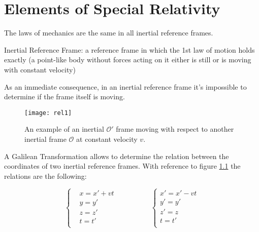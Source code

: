 %
%
%
\chapter{Elements of Special Relativity}
\label{Relativity} %
\begin{postulate}
\label{postulate:galileian-relativity}
The laws of mechanics are the same in all inertial reference frames.\\
\end{postulate}
Inertial Reference Frame: a reference frame in which the 1st law of motion holds exactly (a point-like body without forces acting on it either is still or is moving with constant velocity)

As an immediate consequence, in an inertial reference frame it's impossible to determine if the frame itself is moving. 
\begin{figure}
    \centering
    \texttt{[image: rel1]}
    \caption{An example of an inertial $\mathcal{O}'$ frame moving with respect to another inertial frame $\mathcal{O}$ at constant velocity $v$.}
    \label{fig:rel1}
\end{figure}
A Galilean Transformation allows to determine the relation between the coordinates of two inertial reference frames. With reference to figure \ref{fig:rel1} the relations are the following:

\begin{equation}
\begin{cases}
&x = x' + vt\\
&y = y'\\
&z = z'\\
&t = t'\\  
\end{cases}
\hspace{2cm}
\begin{cases}
x' = x' - vt\\
y' = y'\\
z' = z\\
t = t'\\  
\end{cases}
\end{equation}


